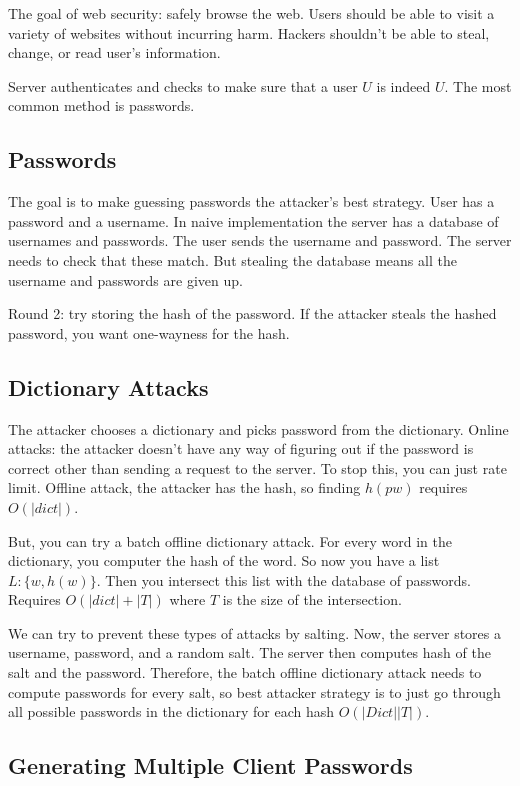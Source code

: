 \documentclass[psamsfonts]{amsart}
\begin{document}
The goal of web security: safely browse the web. Users should be able to visit a variety of websites without incurring harm. Hackers shouldn't be able to steal, change, or read user's information.

Server authenticates and checks to make sure that a user $U$ is indeed $U$. The most common method is passwords.

\subsection{Passwords}

The goal is to make guessing passwords the attacker's best strategy. User has a password and a username. In naive implementation the server has a database of usernames and passwords. The user sends the username and password. The server needs to check that these match. But stealing the database means all the username and passwords are given up.

Round 2: try storing the hash of the password. If the attacker steals the hashed password, you want one-wayness for the hash.

\subsection{Dictionary Attacks}

The attacker chooses a dictionary and picks password from the dictionary. Online attacks: the attacker doesn't have any way of figuring out if the password is correct other than sending a request to the server. To stop this, you can just rate limit. Offline attack, the attacker has the hash, so finding $h(pw)$ requires $O(|dict|)$.

But, you can try a batch offline dictionary attack. For every word in the dictionary, you computer the hash of the word. So now you have a list $L: \{w, h(w) \}$. Then you intersect this list with the database of passwords. Requires $O(|dict| + |T|)$ where $T$ is the size of the intersection.

We can try to prevent these types of attacks by salting. Now, the server stores a username, password, and a random salt. The server then computes hash of the salt and the password. Therefore, the batch offline dictionary attack needs to compute passwords for every salt, so best attacker strategy is to just go through all possible passwords in the dictionary for each hash $O(|Dict||T|)$.

\subsection{Generating Multiple Client Passwords}
\end{document}
